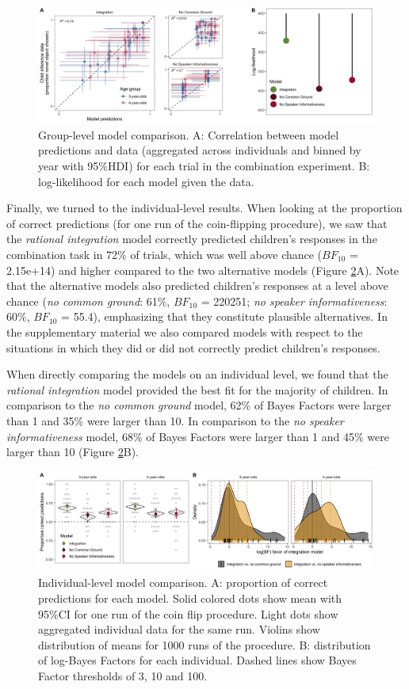 \documentclass[
  man,floatsintext]{apa6}
\begin{document}
\begin{figure}
\includegraphics[width=1\linewidth]{./figures/fig3} \caption{Group-level model comparison. A: Correlation between model predictions and data (aggregated across individuals and binned by year with 95\%HDI) for each trial in the combination experiment. B: log-likelihood for each model given the data.}\label{fig:fig3}
\end{figure}

Finally, we turned to the individual-level results. When looking at the proportion of correct predictions (for one run of the coin-flipping procedure), we saw that the \emph{rational integration} model correctly predicted children's responses in the combination task in 72\% of trials, which was well above chance (\(BF_{10}\) = 2.15e+14) and higher compared to the two alternative models (Figure \ref{fig:fig4}A). Note that the alternative models also predicted children's responses at a level above chance (\emph{no common ground}: 61\%, \(BF_{10}\) = 220251; \emph{no speaker informativeness}: 60\%, \(BF_{10}\) = 55.4), emphasizing that they constitute plausible alternatives. In the supplementary material we also compared models with respect to the situations in which they did or did not correctly predict children's responses.

When directly comparing the models on an individual level, we found that the \emph{rational integration} model provided the best fit for the majority of children. In comparison to the \emph{no common ground} model, 62\% of Bayes Factors were larger than 1 and 35\% were larger than 10. In comparison to the \emph{no speaker informativeness} model, 68\% of Bayes Factors were larger than 1 and 45\% were larger than 10 (Figure \ref{fig:fig4}B).

\begin{figure}
\includegraphics[width=1\linewidth]{./figures/fig4} \caption{Individual-level model comparison. A: proportion of correct predictions for each model. Solid colored dots show mean with 95\%CI for one run of the coin flip procedure. Light dots show aggregated individual data for the same run. Violins show distribution of means for 1000 runs of the procedure. B: distribution of log-Bayes Factors for each individual. Dashed lines show Bayes Factor thresholds of 3, 10 and 100.}\label{fig:fig4}
\end{figure}
\end{document}
